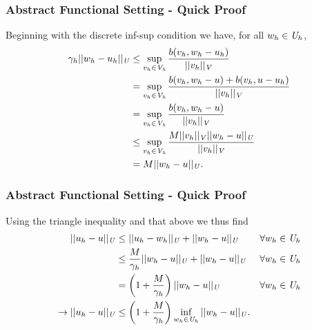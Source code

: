\begin{frame}
\frametitle{Abstract Functional Setting - Quick Proof}

Beginning with the discrete inf-sup condition we have, for all $w_h \in \mathit{{{U}}}_h$,
\begin{align}
  \gamma_h ||w_h-u_h||_{\mathit{{{U}}}}
  & \le \sup_{v_h\in\mathit{{{V_h}}}} \frac{b(v_h,w_h-u_h)}{||v_h||_{\mathit{{{V}}}}} \\
  & = \sup_{v_h\in\mathit{{{V_h}}}} \frac{b(v_h,w_h-u)+b(v_h,u-u_h)}{||v_h||_{\mathit{{{V}}}}} \\
  & = \sup_{v_h\in\mathit{{{V_h}}}} \frac{b(v_h,w_h-u)}{||v_h||_{\mathit{{{V}}}}} \\
  & \le \sup_{v_h\in\mathit{{{V_h}}}} \frac{M ||v_h||_{\mathit{{{V}}}}||w_h-u||_{\mathit{{{U}}}}}{||v_h||_{\mathit{{{V}}}}} \\
  & = M ||w_h-u||_{\mathit{{{U}}}}.
\end{align}

\end{frame}

\begin{frame}
\frametitle{Abstract Functional Setting - Quick Proof}

Using the triangle inequality and that above we thus find
\begin{align}
  ||u_h-u||_\fspace{U}
  & \le || u_h-w_h ||_\fspace{U} + || w_h-u ||_\fspace{U}\ && \forall w_h \in \fspace{U}_h \\
  & \le \frac{M}{\gamma_h} || w_h-u ||_\fspace{U} + || w_h-u ||_\fspace{U}\ && \forall w_h \in \fspace{U}_h \\
  & = \left(1 + \frac{M}{\gamma_h}\right) || w_h-u ||_\fspace{U}\ && \forall w_h \in \fspace{U}_h \\
  \rightarrow
  ||u_h-u||_\fspace{U} & \le \left(1 + \frac{M}{\gamma_h}\right) \inf_{w_h \in \fspace{U}_h}|| w_h-u ||_\fspace{U}.
\end{align}

\end{frame}

